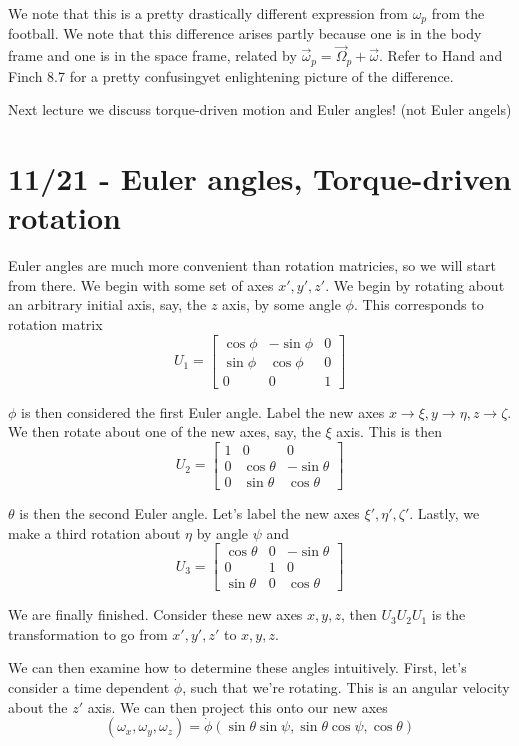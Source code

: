 \documentclass[10pt]{report}
\begin{document}
We note that this is a pretty drastically different expression from $\omega_p$ from the football. We note that this difference arises partly because one is in the body frame and one is in the space frame, related by $\vec{\omega}_p = \vec{\Omega}_p + \vec{\omega}$. Refer to Hand and Finch 8.7 for a pretty confusingyet enlightening picture of the difference. 

Next lecture we discuss torque-driven motion and Euler angles! (not Euler angels)

\chapter{11/21 - Euler angles, Torque-driven rotation}

Euler angles are much more convenient than rotation matricies, so we will start from there. We begin with some set of axes $x', y', z'$. We begin by rotating about an arbitrary initial axis, say, the $z$ axis, by some angle $\phi$. This corresponds to rotation matrix
$$U_1 = \begin{bmatrix}\cos \phi & -\sin \phi & 0\\\sin \phi & \cos \phi & 0\\0&0&1\end{bmatrix}$$

$\phi$ is then considered the first Euler angle. Label the new axes $x \to \xi, y \to \eta, z \to \zeta$. We then rotate about one of the new axes, say, the $\xi$ axis. This is then
$$U_2 = \begin{bmatrix}1&0&0\\0&\cos \theta & -\sin \theta\\0 & \sin \theta & \cos \theta\end{bmatrix}$$

$\theta$ is then the second Euler angle. Let's label the new axes $\xi', \eta', \zeta'$. Lastly, we make a third rotation about $\eta$ by angle $\psi$ and
$$U_3 = \begin{bmatrix}\cos \theta&0&-\sin \theta\\0&1 & 0\\\sin \theta & 0 & \cos \theta\end{bmatrix}$$

We are finally finished. Consider these new axes $x,y,z$, then $U_3 U_2 U_1$ is the transformation to go from $x',y',z'$ to $x,y,z$.

We can then examine how to determine these angles intuitively. First, let's consider a time dependent $\dot{\phi}$, such that we're rotating. This is an angular velocity about the $z'$ axis. We can then project this onto our new axes
$$\left( \omega_x, \omega_y, \omega_z \right) = \dot{\phi}\left( \sin \theta\sin \psi, \sin \theta \cos \psi, \cos \theta \right)$$
\end{document}
